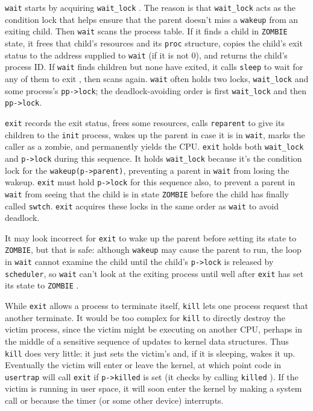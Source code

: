 \lstinline{wait} starts by acquiring
\lstinline{wait_lock}
.
The reason is that \lstinline{wait_lock} acts as the condition
lock that helps ensure that the parent doesn't miss a \lstinline{wakeup}
from an exiting child.
Then \lstinline{wait} scans the process table.
If it finds a child in \texttt{ZOMBIE} state,
it frees that child's resources and
its \lstinline{proc} structure, copies
the child's exit status to the address supplied to \lstinline{wait}
(if it is not 0),
and returns the child's process ID.
If 
\lstinline{wait}
finds children but none have exited,
it calls
\lstinline{sleep}
to wait for any of them to exit
,
then scans again.
\lstinline{wait} often holds two locks,
\lstinline{wait_lock} and some process's \lstinline{pp->lock};
the deadlock-avoiding order is first \lstinline{wait_lock}
and then \lstinline{pp->lock}.

\lstinline{exit}  records the exit
status, frees some resources, calls \lstinline{reparent} to give its
children to the \lstinline{init} process, wakes up the parent in case
it is in \lstinline{wait}, marks the caller as a zombie, and
permanently yields the CPU. \lstinline{exit} holds both
\lstinline{wait_lock} and \lstinline{p->lock} during this
sequence.
It holds \lstinline{wait_lock} because 
it's the condition
lock for the \lstinline{wakeup(p->parent)}, preventing a parent in
\lstinline{wait} from losing the wakeup. \lstinline{exit} must hold
\lstinline{p->lock} for this sequence also, to prevent a parent in
\lstinline{wait} from seeing that the child is in state
\lstinline{ZOMBIE} before the child has finally called
\lstinline{swtch}. \lstinline{exit} acquires these locks in
the same order as \lstinline{wait} to avoid deadlock.

It may look incorrect for \lstinline{exit} to wake up the parent
before setting its state to \lstinline{ZOMBIE}, 
but that is safe:
although
\lstinline{wakeup}
may cause the parent to run,
the loop in
\lstinline{wait}
cannot examine the child until the child's
\lstinline{p->lock}
is released by {\tt scheduler},
so
\lstinline{wait}
can't look at
the exiting process until well after
\lstinline{exit}
has set its state to
\lstinline{ZOMBIE}
.

While
\lstinline{exit} 
allows a process to terminate itself,
\lstinline{kill}
lets one process request that another terminate.
It would be too complex for
\lstinline{kill}
to directly destroy the victim process, since the victim
might be executing on another CPU, perhaps
in the middle of a sensitive sequence of updates to kernel data structures.
Thus
\lstinline{kill}
does very little: it just sets the victim's
and, if it is sleeping, wakes it up.
Eventually the victim will enter or leave the kernel,
at which point code in
\lstinline{usertrap}
will call
\lstinline{exit}
if
\lstinline{p->killed}
is set
(it checks by calling
\lstinline{killed}
).
If the victim is running in user space, it will soon enter
the kernel by making a system call or because the timer (or
some other device) interrupts.

